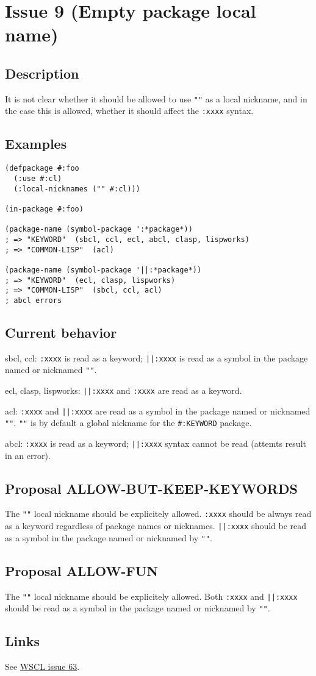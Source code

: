 \documentclass[11pt]{article}
\author{Grolter Bell}
\date{\today}
\title{}
\begin{document}
\section{Issue 9 (Empty package local name)}
\label{sec:org679c22a}
\subsection{Description}
\label{sec:org15945b5}
It is not clear whether it should be allowed to use \texttt{""} as a local nickname,
and in the case this is allowed, whether it should affect the \texttt{:xxxx} syntax.
\subsection{Examples}
\label{sec:org5092a3e}
\begin{verbatim}
(defpackage #:foo
  (:use #:cl)
  (:local-nicknames ("" #:cl)))

(in-package #:foo)

(package-name (symbol-package ':*package*))
; => "KEYWORD"  (sbcl, ccl, ecl, abcl, clasp, lispworks)
; => "COMMON-LISP"  (acl)

(package-name (symbol-package '||:*package*))
; => "KEYWORD"  (ecl, clasp, lispworks)
; => "COMMON-LISP"  (sbcl, ccl, acl)
; abcl errors
\end{verbatim}
\subsection{Current behavior}
\label{sec:org0da02f9}
sbcl, ccl:
\texttt{:xxxx} is read as a keyword;
\texttt{||:xxxx} is read as a symbol in the package named or nicknamed \texttt{""}.

ecl, clasp, lispworks:
\texttt{||:xxxx} and \texttt{:xxxx} are read as a keyword.

acl:
\texttt{:xxxx} and \texttt{||:xxxx} are read as a symbol in the package named or nicknamed \texttt{""}.
\texttt{""} is by default a global nickname for the \texttt{\#:KEYWORD} package.

abcl:
\texttt{:xxxx} is read as a keyword;
\texttt{||:xxxx} syntax cannot be read (attemts result in an error).
\subsection{Proposal ALLOW-BUT-KEEP-KEYWORDS}
\label{sec:orgef5e5cb}
The \texttt{""} local nickname should be explicitely allowed. \texttt{:xxxx} should be always
read as a keyword regardless of package names or nicknames. \texttt{||:xxxx} should be
read as a symbol in the package named or nicknamed by \texttt{""}.
\subsection{Proposal ALLOW-FUN}
\label{sec:orgdc12344}
The \texttt{""} local nickname should be explicitely allowed. Both \texttt{:xxxx} and \texttt{||:xxxx}
should be read as a symbol in the package named or nicknamed by \texttt{""}.
\subsection{Links}
\label{sec:orgf77a676}
See \href{https://github.com/s-expressionists/wscl/issues/63}{WSCL issue 63}.
\end{document}
